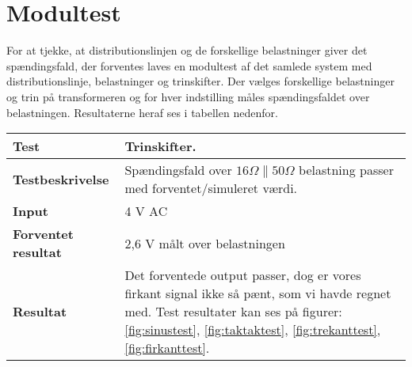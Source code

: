 
\section{Modultest}

For at tjekke, at distributionslinjen og de forskellige belastninger giver det spændingsfald, der forventes laves en modultest af det samlede system med distributionslinje, belastninger og trinskifter. Der vælges forskellige belastninger og trin på transformeren og for hver indstilling måles spændingsfaldet over belastningen. Resultaterne heraf ses i tabellen nedenfor. 

\begin{center}
	\begin{tabular}{ | m{} | m{}|} 
		\hline
		\textbf{Test}					&Trinskifter. \\ \hline
		\textbf{Testbeskrivelse}		&Spændingsfald over $16\Omega\parallel 50\Omega$ belastning passer med forventet/simuleret værdi. \\ \hline
		\textbf{Input}					&4 V AC \\ \hline
		\textbf{Forventet resultat}		&2,6 V målt over belastningen \\ \hline
		\textbf{Resultat}				&Det forventede output passer, dog er vores firkant signal ikke så pænt, som vi havde regnet med. Test resultater kan ses på figurer: \ref{fig:sinustest}, \ref{fig:taktaktest}, \ref{fig:trekanttest}, \ref{fig:firkanttest}.  \\ \hline
	\end{tabular}
\end{center}